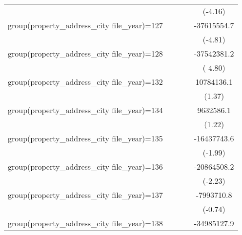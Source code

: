 {\begin{tabular}{l*{4}{c}}
                    &                     &                     &                     &     (-4.16)         \\
\addlinespace
group(property\_address\_city file\_year)=127&                     &                     &                     & -37615554.7\sym{***}\\
                    &                     &                     &                     &     (-4.81)         \\
\addlinespace
group(property\_address\_city file\_year)=128&                     &                     &                     & -37542381.2\sym{***}\\
                    &                     &                     &                     &     (-4.80)         \\
\addlinespace
group(property\_address\_city file\_year)=132&                     &                     &                     &  10784136.1         \\
                    &                     &                     &                     &      (1.37)         \\
\addlinespace
group(property\_address\_city file\_year)=134&                     &                     &                     &   9632586.1         \\
                    &                     &                     &                     &      (1.22)         \\
\addlinespace
group(property\_address\_city file\_year)=135&                     &                     &                     & -16437743.6\sym{*}  \\
                    &                     &                     &                     &     (-1.99)         \\
\addlinespace
group(property\_address\_city file\_year)=136&                     &                     &                     & -20864508.2\sym{*}  \\
                    &                     &                     &                     &     (-2.23)         \\
\addlinespace
group(property\_address\_city file\_year)=137&                     &                     &                     &  -7993710.8         \\
                    &                     &                     &                     &     (-0.74)         \\
\addlinespace
group(property\_address\_city file\_year)=138&                     &                     &                     & -34985127.9\sym{***}\\

\end{tabular}}
